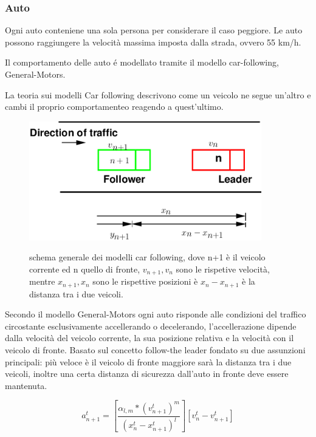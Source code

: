 
\newpage
\subsubsection{Auto}
Ogni auto conteniene una sola persona per considerare il caso peggiore.
Le auto possono raggiungere la velocità massima imposta dalla strada, ovvero 55 km/h.

Il comportamento delle auto é modellato tramite il modello car-following, General-Motors.

La teoria sui modelli Car following descrivono come un veicolo ne segue un'altro
e cambi il proprio comportamenteo reagendo a quest'ultimo.

\begin{figure}[ht]
  \centering
  \includegraphics[width=0.9\textwidth]{images/GM.png}
  \label{fig:general-motors-img}
  \caption{schema generale dei modelli car following, dove n+1 è il veicolo corrente ed n quello di fronte, $v_{n+1}, v_{n}$ sono le rispetive velocità, mentre $x_{n+1}, x_{n}$ sono le rispettive posizioni è $x_{n} - x_{n + 1}$ è la distanza tra i due veicoli.}
\end{figure}

Secondo il modello General-Motors ogni auto risponde alle condizioni del traffico circostante esclusivamente accellerando o decelerando, l'accellerazione dipende dalla velocità del veicolo corrente, la sua posizione relativa e la velocità con il veicolo di fronte.
Basato sul concetto follow-the leader fondato su due assunzioni principali:
più veloce è il veicolo di fronte maggiore sarà la distanza tra i due veicoli,
inoltre una certa distanza di sicurezza dall'auto in fronte deve essere mantenuta.

\begin{equation}
  a_{n+1}^{t} = [ \frac{\alpha_{l, m} * (v_{n + 1}^{t})^{m} }{ (x_{n}^{t} - x_{n + 1}^{t})^{l}}][v_{n}^{t} - v_{n + 1}^{t}]
  \label{eq:general-motors-eq}
\end{equation}


